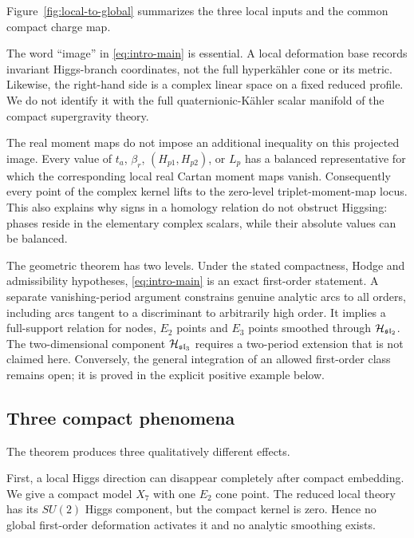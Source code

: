 Figure~\ref{fig:local-to-global} summarizes the three local inputs and the
common compact charge map.


The word ``image'' in \eqref{eq:intro-main} is essential. A local deformation
base records invariant Higgs-branch coordinates, not the full
hyperk\"ahler cone or its metric. Likewise, the right-hand side is a complex
linear space on a fixed reduced profile. We do not identify it with the full
quaternionic-K\"ahler scalar manifold of the compact supergravity theory.

The real moment maps do not impose an additional inequality on this projected
image. Every value of $t_a$, $\beta_r$, $(H_{p1},H_{p2})$, or $L_p$ has a
balanced representative for which the corresponding local real Cartan moment
maps vanish. Consequently every point of the complex kernel lifts to the
zero-level triplet-moment-map locus. This also explains why signs in a homology
relation do not obstruct Higgsing: phases reside in the elementary complex
scalars, while their absolute values can be balanced.

The geometric theorem has two levels. Under the stated compactness, Hodge and
admissibility hypotheses, \eqref{eq:intro-main} is an exact first-order
statement. A separate vanishing-period argument constrains genuine analytic
arcs to all orders, including arcs tangent to a discriminant to arbitrarily
high order. It implies a full-support relation for nodes, $E_2$ points and
$E_3$ points smoothed through $\mathcal H_{\mathfrak{sl}_2}$. The
two-dimensional component $\mathcal H_{\mathfrak{sl}_3}$ requires a two-period
extension that is not claimed here. Conversely, the general integration of
an allowed first-order
class remains open; it is proved in the explicit positive example below.

\subsection*{Three compact phenomena}

The theorem produces three qualitatively different effects.

First, a local Higgs direction can disappear completely after compact
embedding. We give a compact model $X_7$ with one $E_2$ cone point. The
reduced local theory has its $SU(2)$ Higgs component, but the compact kernel
is zero. Hence no global first-order deformation activates it and no analytic
smoothing exists.


